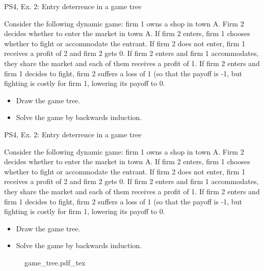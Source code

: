 \begin{frame}{PS4, Ex. 2: Entry deterrence in a game tree}
  \begin{multicols}{2}
    Consider the following dynamic game: firm 1 owns a shop in town A. Firm 2 decides whether to enter the market in town A. If firm 2 enters, firm 1 chooses whether to fight or accommodate the entrant. If firm 2 does not enter, firm 1 receives a profit of 2 and firm 2 gets 0. If firm 2 enters and firm 1 accommodates, they share the market and each of them receives a profit of 1. If firm 2 enters and firm 1 decides to fight, firm 2 suffers a loss of 1 (so that the payoff is -1, but fighting is costly for firm 1, lowering its payoff to 0.
    \begin{itemize}
      \item[(a)] Draw the game tree.
      \item[(b)] Solve the game by backwards induction.
    \end{itemize}
  \vfill\null \columnbreak
  \vfill\null
  \end{multicols}
\end{frame}
\begin{frame}{PS4, Ex. 2: Entry deterrence in a game tree}
  \begin{multicols}{2}
    Consider the following dynamic game: firm 1 owns a shop in town A. Firm 2 decides whether to enter the market in town A. If firm 2 enters, firm 1 chooses whether to fight or accommodate the entrant. If firm 2 does not enter, firm 1 receives a profit of 2 and firm 2 gets 0. If firm 2 enters and firm 1 accommodates, they share the market and each of them receives a profit of 1. If firm 2 enters and firm 1 decides to fight, firm 2 suffers a loss of 1 (so that the payoff is -1, but fighting is costly for firm 1, lowering its payoff to 0.
    \begin{itemize}
      \item[(a)] Draw the game tree.
      \item[(b)] Solve the game by backwards induction.
    \end{itemize}
  \vfill\null \columnbreak
    \begin{figure}[!h]
      \begin{center}
      \def\svgwidth{1.0\columnwidth}
      {game_tree.pdf_tex}
      \end{center}
    \end{figure}
  \vfill\null
  \end{multicols}
\end{frame}
